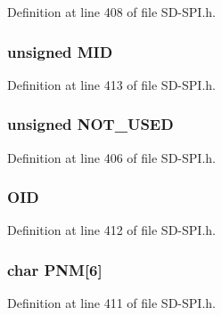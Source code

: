 Definition at line 408 of file S\+D-\/\+S\+P\+I.\+h.

\hypertarget{union_c_i_d_ab8f6a6de0f016ac105519fc2de4c5780}{}
\subsubsection[{M\+I\+D}]{\setlength{\rightskip}{0pt plus 5cm}unsigned M\+I\+D}\label{union_c_i_d_ab8f6a6de0f016ac105519fc2de4c5780}


Definition at line 413 of file S\+D-\/\+S\+P\+I.\+h.

\hypertarget{union_c_i_d_a75098a81c518e187eb7a43cc63ad1a9e}{}
\subsubsection[{N\+O\+T\+\_\+\+U\+S\+E\+D}]{\setlength{\rightskip}{0pt plus 5cm}unsigned N\+O\+T\+\_\+\+U\+S\+E\+D}\label{union_c_i_d_a75098a81c518e187eb7a43cc63ad1a9e}


Definition at line 406 of file S\+D-\/\+S\+P\+I.\+h.

\hypertarget{union_c_i_d_a11897b65a89ff97725a26be0a7254aea}{}
\subsubsection[{O\+I\+D}]{ O\+I\+D}\label{union_c_i_d_a11897b65a89ff97725a26be0a7254aea}


Definition at line 412 of file S\+D-\/\+S\+P\+I.\+h.

\hypertarget{union_c_i_d_a199716392bb65c6b1f6d57036c8f9a69}{}
\subsubsection[{P\+N\+M}]{\setlength{\rightskip}{0pt plus 5cm}char P\+N\+M\mbox{[}6\mbox{]}}\label{union_c_i_d_a199716392bb65c6b1f6d57036c8f9a69}


Definition at line 411 of file S\+D-\/\+S\+P\+I.\+h.

\hypertarget{union_c_i_d_ae7063e98e2b95855058a6b78b92f1d90}{}
